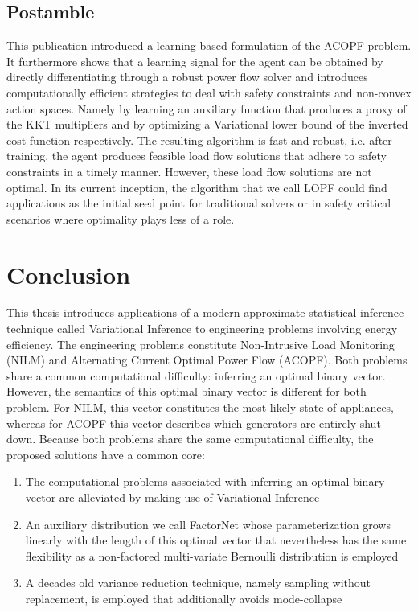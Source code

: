\documentclass[11pt]{cmuthesis} %
\begin{document}
\section{Postamble}
This publication introduced a learning based formulation of the ACOPF problem. It furthermore shows that a learning signal for the agent can be obtained by directly differentiating through a robust power flow solver and introduces computationally efficient strategies to deal with safety constraints and non-convex action spaces. Namely by learning an auxiliary function that produces a proxy of the KKT multipliers and by optimizing a Variational lower bound of the inverted cost function respectively. The resulting algorithm is fast and robust, i.e. after training, the agent produces feasible load flow solutions that adhere to safety constraints in a timely manner. However, these load flow solutions are not optimal. In its current inception, the algorithm that we call LOPF could find applications as the initial seed point for traditional solvers or in safety critical scenarios where optimality plays less of a role.


\chapter{Conclusion}

This thesis introduces applications of a modern approximate statistical inference technique called Variational Inference to engineering problems involving energy efficiency. The engineering problems constitute Non-Intrusive Load Monitoring (NILM) and Alternating Current Optimal Power Flow (ACOPF). Both problems share a common computational difficulty: inferring an optimal binary vector. However, the semantics of this optimal binary vector is different for both problem. For NILM, this vector constitutes the most likely state of appliances, whereas for ACOPF this vector describes which generators are entirely shut down. Because both problems share the same computational difficulty, the proposed solutions have a common core:

\begin{enumerate}
\item The computational problems associated with inferring an optimal binary vector are alleviated by making use of Variational Inference
\item An auxiliary distribution we call FactorNet whose parameterization grows linearly with the length of this optimal vector that nevertheless has the same flexibility as a non-factored multi-variate Bernoulli distribution is employed
\item A decades old variance reduction technique, namely sampling without replacement, is employed that additionally avoids mode-collapse
\end{enumerate}
\end{document}
